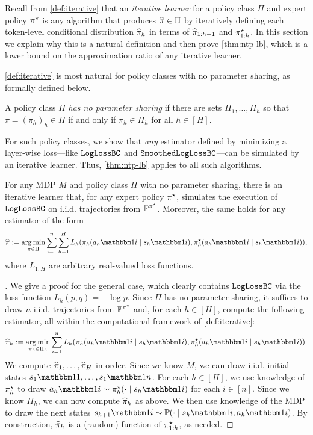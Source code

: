 Recall from \cref{def:iterative} that an \emph{iterative learner} for a policy class $\Pi$ and expert policy $\pi^{\star}$ is any algorithm that produces $\widehat{\pi} \in \Pi$ by iteratively defining each token-level conditional distribution $\widehat{\pi}_h$ in terms of $\widehat{\pi}_{1:h-1}$ and $\pi^{\star}_{1:h}$. In this section we explain why this is a natural definition and then prove \cref{thm:ntp-lb}, which is a lower bound on the approximation ratio of any iterative learner.

\cref{def:iterative} is most natural for policy classes with no parameter sharing, as formally defined below.

\begin{definition}
A policy class $\Pi$ \emph{has no parameter sharing} if there are sets $\Pi_1,\dots,\Pi_h$ so that $\pi = (\pi_h)_h \in \Pi$ if and only if $\pi_h \in \Pi_h$ for all $h \in [H]$.
\end{definition}

For such policy classes, we show that \emph{any} estimator defined by minimizing a layer-wise loss---like $\texttt{LogLossBC}$ and $\texttt{SmoothedLogLossBC}$---can be simulated by an iterative learner. Thus, \cref{thm:ntp-lb} applies to all such algorithms.

\begin{proposition}\label{prop:iterative-simulation}
For any MDP $M$ and policy class $\Pi$ with no parameter sharing, there is an iterative learner that, for any expert policy $\pi^{\star}$, simulates the execution of $\texttt{LogLossBC}$ on i.i.d. trajectories from $\mathbb{P}^{\pi^{\star}}$. Moreover, the same holds for any estimator of the form
\[\pihat := \argmin_{\pi\in\Pi} \sum_{i=1}^n \sum_{h=1}^H L_h(\pi_h(a_h\ind{i}\mid{}s_h\ind{i}), \pistar_h(a_h\ind{i}\mid{}s_h\ind{i})),\]
where $L_{1:H}$ are arbitrary real-valued loss functions.
\end{proposition}

\begin{proof}[]
We give a proof for the general case, which clearly contains $\texttt{LogLossBC}$ via the loss function $L_h(p,q) = -\log p$. Since $\Pi$ has no parameter sharing, it suffices to draw $n$ i.i.d. trajectories from $\mathbb{P}^{\pi^{\star}}$ and, for each $h \in [H]$, compute the following estimator, all within the computational framework of \cref{def:iterative}:
\[\pihat_h := \argmin_{\pi_h\in\Pi_h} \sum_{i=1}^n L_h(\pi_h(a_h\ind{i}\mid{}s_h\ind{i}),\pistar_h(a_h\ind{i}\mid{}s_h\ind{i})).\]
We compute $\widehat{\pi}_1,\dots,\widehat{\pi}_H$ in order. Since we know $M$, we can draw i.i.d. initial states $s_1\ind{1},\dots,s_1\ind{n}$. For each $h \in [H]$, we use knowledge of $\pi^{\star}_h$ to draw $a_h\ind{i} \sim \pistar_h(\cdot\mid{}s_h\ind{i})$ for each $i \in [n]$. Since we know $\Pi_h$, we can now compute $\widehat{\pi}_h$ as above. We then use knowledge of the MDP to draw the next states $s_{h+1}\ind{i} \sim \BP(\cdot\mid{}s_h\ind{i},a_h\ind{i})$. By construction, $\widehat{\pi}_h$ is a (random) function of $\pi^{\star}_{1:h}$, as needed.
\end{proof}

